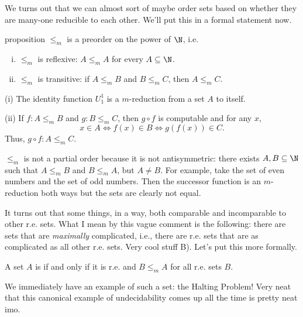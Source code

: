 \documentclass[class=article, crop=false]{standalone}
\begin{document}
We turns out that we can almost sort of maybe order sets based on whether they are many-one reducible to each other. We'll put this in a formal statement now.
\begin{result}{proposition}{\label{prop:leq_m-as-a-preorder}}
  $\leq_m$ is a preorder on the power of $\N$, i.e.
    \begin{enumerate}[(i)]
      \item $\leq_m$ is reflexive: $A \leq_m A$ for every $A \subseteq \N$.
      \item $\leq_m$ is transitive: if $A \leq_m B$ and $B\leq_m C$, then $A \leq_m C$.
    \end{enumerate}
\end{result}
\begin{pf}
  (i) The identity function $U_1^1$ is a $m$-reduction from a set $A$ to itself.

  (ii) If $f\colon A \leq_m B$ and $g \colon B \leq_m C$, then $g \circ f$ is computable and for any $x$,
    \[
      x \in A \iff f(x) \in B \iff g(f(x)) \in C.
    \]
  Thus, $g \circ f \colon A \leq_m C$.
\end{pf}
\begin{rem}
  $\leq_m$ is not a partial order because it is not antisymmetric: there exists $A,B \subseteq \N$ such that $A \leq_m B$ and $B \leq_m A$, but $A \neq B$. For example, take the set of even numbers and the set of odd numbers. Then the successor function is an $m$-reduction both ways but the sets are clearly not equal.
\end{rem}

It turns out that some things, in a way, both comparable and incomparable to other r.e. sets. What I mean by this vague comment is the following: there are sets that are \emph{maximally} complicated, i.e., there are r.e. sets that are as complicated as all other r.e. sets. Very cool stuff B). Let's put this more formally.
\begin{defn}
  A set $A$ is  if and only if it is r.e. and $B \leq_m A$ for all r.e. sets $B$.
\end{defn}

We immediately have an example of such a set: the Halting Problem! Very neat that this canonical example of undecidability comes up all the time is pretty neat imo.
\end{document}
